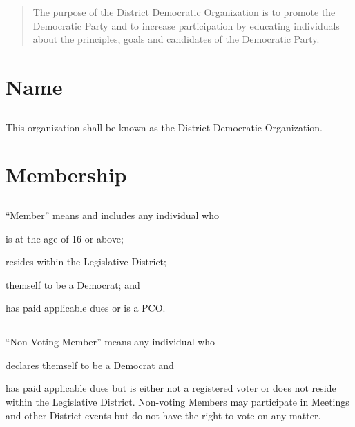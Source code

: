 \begin{abstract}
The purpose of the \fortythird{} District Democratic Organization is to promote the Democratic Party and to increase participation by educating individuals about the principles, goals and candidates of the Democratic Party.
\end{abstract}

\section{Name}
\subsection{}
This organization shall be known as the \fortythird{} District Democratic Organization.

\section{Membership}
\subsection{} \label{member}
“Member” means and includes any individual who
\begin{inlinealphalist}
    \item is at the age of 16 or above;
    \item resides within the \fortythird{} Legislative District;
    \item themself to be a Democrat; and
    \item has paid applicable dues or is a PCO.
\end{inlinealphalist}

\subsection{} \label{non-voting-member}
“Non-Voting Member” means any individual who
\begin{inlinealphalist}
    \item declares themself to be a Democrat and
    \item has paid applicable dues but is either not a registered voter or does not reside within the \fortythird{} Legislative District. Non-voting Members may participate in Meetings and other \fortythird{} District events but do not have the right to vote on any matter.
\end{inlinealphalist}


